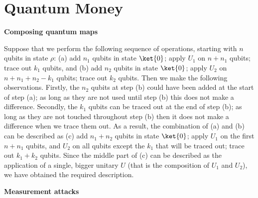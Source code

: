 \newcommand{\GC}{\ensuremath{\textsc{CLONE}}}
\chapter{Quantum Money}

\begin{exercises}


\item {\bf Composing quantum maps}

Suppose that we perform the following sequence of operations, starting with $n$ qubits in state $\rho$: (a) add $n_1$ qubits in state $\ket{0}$; apply $U_1$ on $n+n_1$ qubits; trace out $k_1$ qubits, and (b) add $n_2$ qubits in state $\ket{0}$; apply $U_2$ on $n+n_1+n_2-k_1$ qubits; trace out $k_2$ qubits. Then we make the following observations. Firstly, the $n_2$ qubits at step (b) could have been added at the start of step (a); as long as they are not used until step (b) this does not make a difference. Secondly, the $k_1$ qubits can be traced out at the end of step (b); as long as they are not touched throughout step (b) then it does not make a difference when we trace them out. As a result, the combination of (a) and (b) can be described as (c) add $n_1+n_2$ qubits in state $\ket{0}$; apply $U_1$ on the first $n+n_1$ qubits, and $U_2$ on all qubits except the $k_1$ that will be traced out; trace out $k_1+k_2$ qubits. Since the middle part of (c) can be described as the application of a single, bigger unitary $U$ (that is the composition of $U_1$ and $U_2$), we have obtained the required description. 


\item {\bf Measurement attacks}


\end{exercises}
